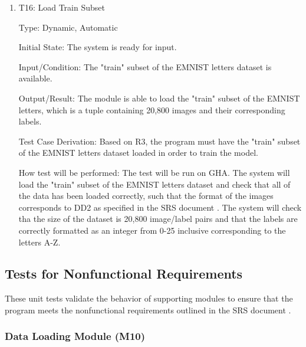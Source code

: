 \documentclass[12pt, titlepage]{article}
\begin{document}
\begin{enumerate}

\item{T16: Load Train Subset\\}

Type: Dynamic, Automatic

Initial State: The \progname{} system is ready for input.

Input/Condition: The "train" subset of the EMNIST letters dataset is available.

Output/Result: The module is able to load the "train" subset of the EMNIST
letters, which is a tuple containing 20,800 images and their corresponding
labels.

Test Case Derivation: Based on R3, the program must have the "train" subset
of the EMNIST letters dataset loaded in order to train the model.

How test will be performed: The test will be run on GHA. The system will load the
"train" subset of the EMNIST letters dataset and check that all of the
data has been loaded correctly, such that the format of the images corresponds
to DD2 as specified in the SRS document \citep{SRS}. The system will check tha
the size of the dataset is 20,800 image/label pairs and that the labels are
correctly formatted as an integer from 0-25 inclusive corresponding to the
letters A-Z.

\end{enumerate}

\subsection{Tests for Nonfunctional Requirements}

These unit tests validate the behavior of supporting modules to ensure that the
\progname{} program meets the nonfunctional requirements outlined in the SRS
document \citep{SRS}.




\subsubsection{Data Loading Module (M10)}
\end{document}
